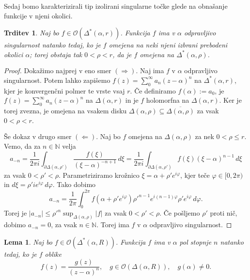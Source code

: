\documentclass[10pt, a4paper]{article}
\newtheorem{trditev}[izr]{Trditev}
\newtheorem{lema}[izr]{Lema}
\newenvironment{noticeC}{%
  \tcolorbox[%
  notitle,
  empty,
  enhanced,  %
  breakable,
  coltext=black, 
  fontupper=\rmfamily,
  parbox=false,
  noparskip,
  sharp corners,
  boxrule=-1pt,  %
  frame hidden,
  left=7pt,  %
  right=7pt,
  top=5pt,
  bottom=5pt,
  before skip=2.5ex plus 2pt,
  after skip=2.5ex plus 2pt,
  overlay unbroken and last={%
  },
  ]}
{\endtcolorbox}
\newenvironment{dokaz}%
  {\begin{noticeC}\begin{proof}}%
  {\end{proof}\end{noticeC}}
\newcommand{\N}{\mathbb {N}}
\begin{document}
Sedaj bomo karakterizirali tip izolirani singularne točke
glede na obnašanje funkcije v njeni okolici.

\begin{trditev}
  Naj bo $f \in \mathcal{O} (\Delta^* (\alpha, r))$. Funkcija $f$ ima v $\alpha$
  odpravljivo singularnost natanko tedaj, ko je $f$ omejena na neki njeni izbrani prebodeni okolici 
  $\alpha$; torej obstaja tak $0 < \rho < r$, da je $f$ omejena na $\Delta^* (\alpha, \rho)$.
\end{trditev}

\begin{dokaz}
  Dokažimo najprej v eno smer $(\Rightarrow)$. Naj ima $f$ v $\alpha$
  odpravljivo singularnost.
  Potem lahko zapišemo $f(z) = \sum_0 ^\infty a_n (z - \alpha)^n$ na $\Delta^* (\alpha, r)$,
  kjer je konvergenčni polmer te vrste vsaj $r$.
  Če definiramo $f(\alpha) := a_0$, je $f(z) = \sum_0 ^\infty a_n ( z - \alpha)^n$
  na $\Delta(\alpha, r)$ in je $f$ holomorfna na $\Delta (\alpha, r)$.
  Ker je torej zvezna, je omejena na vsakem disku $\Delta (\alpha, \rho) \subseteq \overline{\Delta (\alpha, \rho)}$
  za vsak $0 < \rho < r$. 
  
  Še dokaz v drugo smer $(\Leftarrow)$.
  Naj bo $f$ omejena na $\Delta (\alpha, \rho)$ za nek $0 < \rho \leq r$.
  Vemo, da za $n \in \N$  velja 
  $$a_{-n} = \frac{1}{2\pi i} \int_{\partial \Delta (\alpha, \rho')} \frac{f(\xi)}{(\xi - \alpha)^{-n +1}}\, d\xi = \frac{1}{2\pi i} \int_{\partial \Delta (\alpha, \rho')} f(\xi) (\xi - \alpha)^{n - 1}\, d\xi$$
  za vsak $0 < \rho' < \rho$. Parametriziramo krožnico $\xi = \alpha + \rho' e^{i\varphi}$, kjer teče $\varphi \in [0, 2\pi)$
  in $d\xi = \rho' i e^{i \varphi} \, d\varphi.$ Tako dobimo 
  $$a_{-n} = \frac{1}{2 \pi} \int_0 ^{2 \pi} f(\alpha + \rho' e^{i \varphi}) {\rho'}^{n - 1} e^{i(n - 1) \varphi} \rho' e^{i \varphi}\, d\varphi.$$
  Torej je $|a_{-n}| \leq \rho'^n \sup_{\Delta(\alpha, \rho)} |f|$ za vsak $0 < \rho' < \rho$.
  Če pošljemo $\rho'$ proti nič, dobimo $a_{-n} = 0$, za vsak $n \in \N$.
  Torej ima $f$ v $\alpha$ odpravljivo singularnost.
\end{dokaz}

\begin{lema}
  Naj bo $f \in \mathcal{O} (\Delta^* (\alpha, R))$. Funkcija $f$ ima v $\alpha$ pol stopnje $n$ natanko tedaj, 
  ko je $f$ oblike 
  $$f(z) = \frac{g(z)}{(z - \alpha)^n},\quad g \in \mathcal{O} (\Delta (\alpha, R)),\quad g(\alpha) \neq 0.$$
\end{lema}
\end{document}
